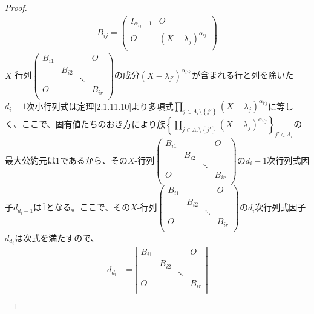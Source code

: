 \documentclass[dvipdfmx]{jsarticle}
\begin{document}
\begin{proof}
\begin{align*}
B_{ij} = \begin{pmatrix}
I_{\alpha_{ij} - 1} & O \\
O & \left( X - \lambda_{j} \right)^{\alpha_{ij}} \\
\end{pmatrix}
\end{align*}
$X$-行列$\begin{pmatrix}
B_{i1} & \  & \  & O \\
\  & B_{i2} & \  & \  \\
\  & \  & \ddots & \  \\
O & \  & \  & B_{ir} \\
\end{pmatrix}$の成分$\left( X - \lambda_{j'} \right)^{\alpha_{i'j'}}$が含まれる行と列を除いた$d_{i} - 1$次小行列式は定理\ref{2.1.11.10}より多項式$\prod_{j \in \varLambda_{r} \setminus \left\{ j' \right\}} \left( X - \lambda_{j} \right)^{\alpha_{i'j}}$に等しく、ここで、固有値たちのおき方により族$\left\{ \prod_{j \in \varLambda_{r} \setminus \left\{ j' \right\}} \left( X - \lambda_{j} \right)^{\alpha_{i'j}} \right\}_{j' \in \varLambda_{r}}$の最大公約元は$\overline{1}$であるから、その$X$-行列$\begin{pmatrix}
B_{i1} & \  & \  & O \\
\  & B_{i2} & \  & \  \\
\  & \  & \ddots & \  \\
O & \  & \  & B_{ir} \\
\end{pmatrix}$の$d_{i} - 1$次行列式因子$d_{d_{i} - 1}$は$\overline{1}$となる。ここで、その$X$-行列$\begin{pmatrix}
B_{i1} & \  & \  & O \\
\  & B_{i2} & \  & \  \\
\  & \  & \ddots & \  \\
O & \  & \  & B_{ir} \\
\end{pmatrix}$の$d_{i}$次行列式因子$d_{d_{i}}$は次式を満たすので、
\begin{align*}
d_{d_{i}} &= \left| \begin{matrix}
B_{i1} & \  & \  & O \\
\  & B_{i2} & \  & \  \\
\  & \  & \ddots & \  \\
O & \  & \  & B_{ir} \\
\end{matrix} \right|\\

\end{align*}
\end{proof}
\end{document}
